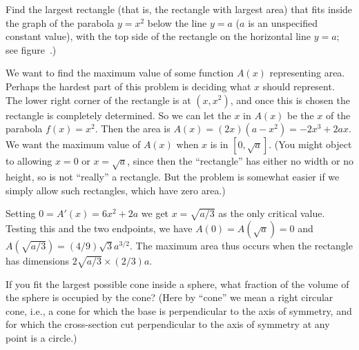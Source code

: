 \begin{example} Find the largest rectangle (that is, the rectangle with largest
area) that fits inside the graph of the parabola $y=x^2$ below the
line $y=a$ ($a$ is an unspecified constant value), with the top side of
the rectangle on the horizontal line $y=a$; see
figure~.)
\end{example}

\begin{solution}
We want to find the maximum value of some function $A(x)$ representing
area.  Perhaps the hardest part of this problem is deciding what $x$
should represent. The lower right corner of the rectangle is at
$(x,x^2)$, and once this is chosen the rectangle is completely
determined. So we can let the $x$ in $A(x)$ be the $x$ of the parabola
$f(x)=x^2$.  Then the area is $A(x)=(2x)(a-x^2)=-2x^3+2ax$. We want
the maximum value of $A(x)$ when $x$ is in $[0,\sqrt{a}]$. (You might
object to allowing $x=0$ or $x=\sqrt{a}$, since then the ``rectangle''
has either no width or no height, so is not ``really'' a
rectangle. But the problem is somewhat easier if we simply allow such
rectangles, which have zero area.) 

Setting $0=A'(x)=6x^2+2a$ we get $x=\sqrt{a/3}$ as the only critical
value. Testing this and the two endpoints, we have
$A(0)=A(\sqrt{a})=0$ and $A(\sqrt{a/3})=(4/9)\sqrt{3}a^{3/2}$. The
maximum area thus occurs when the rectangle has dimensions
$2\sqrt{a/3}\times (2/3)a$.
\end{solution}


\begin{example}
If you fit the largest possible cone inside a sphere, what fraction of the
volume of the sphere is occupied by the cone?  (Here by ``cone'' we mean a
right circular cone, i.e., a cone for which the base is perpendicular to
the axis of symmetry, and for which the cross-section cut perpendicular to
the axis of symmetry at any point is a circle.)
\end{example}

